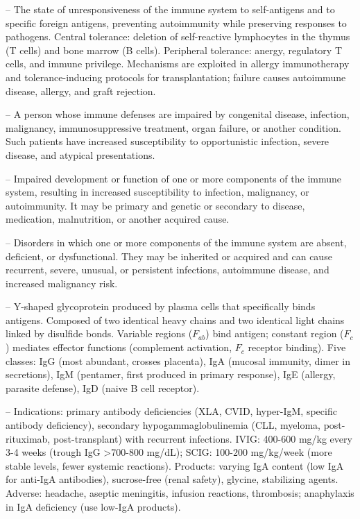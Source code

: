 -- The state of unresponsiveness of the immune system to self-antigens and to specific foreign antigens, preventing autoimmunity while preserving responses to pathogens. Central tolerance: deletion of self-reactive lymphocytes in the thymus (T cells) and bone marrow (B cells). Peripheral tolerance: anergy, regulatory T cells, and immune privilege. Mechanisms are exploited in allergy immunotherapy and tolerance-inducing protocols for transplantation; failure causes autoimmune disease, allergy, and graft rejection.

-- A person whose immune defenses are impaired by congenital disease, infection, malignancy, immunosuppressive treatment, organ failure, or another condition. Such patients have increased susceptibility to opportunistic infection, severe disease, and atypical presentations.

-- Impaired development or function of one or more components of the immune system, resulting in increased susceptibility to infection, malignancy, or autoimmunity. It may be primary and genetic or secondary to disease, medication, malnutrition, or another acquired cause.

-- Disorders in which one or more components of the immune system are absent, deficient, or dysfunctional. They may be inherited or acquired and can cause recurrent, severe, unusual, or persistent infections, autoimmune disease, and increased malignancy risk.

-- Y-shaped glycoprotein produced by plasma cells that specifically binds antigens. Composed of two identical heavy chains and two identical light chains linked by disulfide bonds. Variable regions ($F_{ab}$) bind antigen; constant region ($F_c$) mediates effector functions (complement activation, $F_c$ receptor binding). Five classes: IgG (most abundant, crosses placenta), IgA (mucosal immunity, dimer in secretions), IgM (pentamer, first produced in primary response), IgE (allergy, parasite defense), IgD (naive B cell receptor).

-- Indications: primary antibody deficiencies (XLA, CVID, hyper-IgM, specific antibody deficiency), secondary hypogammaglobulinemia (CLL, myeloma, post-rituximab, post-transplant) with recurrent infections. IVIG: 400-600 mg/kg every 3-4 weeks (trough IgG >700-800 mg/dL); SCIG: 100-200 mg/kg/week (more stable levels, fewer systemic reactions). Products: varying IgA content (low IgA for anti-IgA antibodies), sucrose-free (renal safety), glycine, stabilizing agents. Adverse: headache, aseptic meningitis, infusion reactions, thrombosis; anaphylaxis in IgA deficiency (use low-IgA products).

